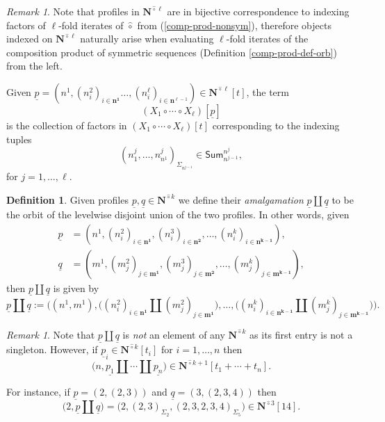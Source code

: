 \documentclass[11pt]{amsart}
\theoremstyle{definition}
\newtheorem{definition}[subsection]{Definition}
\theoremstyle{remark}
\newtheorem{remark}[subsection]{Remark}
\newcommand{\Ncirc}[1]{\mathbf{N}^{\hat{\circ}#1}}
\newcommand{\circhat}{\hat{\circ}}
\begin{document}
\begin{remark}
Note that profiles in $\Ncirc{\ell}$ are in bijective correspondence to indexing factors of $\ell$-fold iterates of $\circhat$ from (\ref{comp-prod-nonsym}), therefore objects indexed on $\Ncirc{\ell}$ naturally arise when evaluating $\ell$-fold iterates of the composition product of symmetric sequences (Definition \ref{comp-prod-def-orb}) from the left. 
\end{remark}

Given $\underline{p}=(n^1, (n^2_i)_{i\in\mathbf{n^1}}\dots, (n^{\ell}_i)_{i\in\mathbf{n}^{\ell-1}})\in\Ncirc{\ell}[t]$, the term \[(X_1\circ \cdots \circ X_{\ell})[\underline{p}]\] is the collection of factors in $(X_1\circ\cdots \circ X_{\ell})[t]$ corresponding to the indexing tuples \[(n^j_1,\dots,n^j_{n^1})_{\Sigma_{n^{j-1}}}\in\mathsf{Sum}_{n^{j-1}}^{n^j},\] for $j=1,\dots, \ell$.


\begin{definition} 
Given profiles $\underline{p},\underline{q}\in\Ncirc{k}$ we define their \textit{amalgamation} $\underline{p}\amalg \underline{q}$ to be the orbit of the levelwise disjoint union of the two profiles. In other words, given \begin{align*} 
\underline{p} & =(n^1,(n^2_{i})_{i\in \mathbf{n^1}}, (n^3_{i})_{i\in \mathbf{n^2}},\dots, (n^{k}_{i})_{i\in \mathbf{n^{k-1}}}), \\
\underline{q} & =(m^1,(m^2_{j})_{j\in \mathbf{m^1}}, (m^3_{j})_{j\in \mathbf{m^2}},\dots, (m^{k}_{j})_{j\in \mathbf{m^{k-1}}}),
\end{align*}
then $\underline{p}\amalg\underline{q}$ is given by\begin{equation*}
\underline{p}\amalg \underline{q}:=\Big((n^1,m^1),\big( (n^2_{i})_{i\in \mathbf{n^1}} \amalg (m^2_{j})_{j\in \mathbf{m^1}} \big) , \dots, \big( (n^{k}_{i})_{i\in \mathbf{n^{k-1}}} \amalg (m^{k}_{j})_{j\in \mathbf{m^{k-1}}}\big) \Big).\end{equation*}
\end{definition}

\begin{remark} Note that $\underline{p}\amalg \underline{q}$ is \textit{not} an element of any $\Ncirc{k}$ as its first entry is not a singleton. However, if $\underline{p}_i\in \Ncirc{k}[t_i]$ for $i=1,\dots,n$ then \[\big( n, \underline{p_1}\amalg\cdots \amalg \underline{p_n} \big)\in \Ncirc{k+1}[t_1+\cdots+t_n].\]

For instance, if $\underline{p}=(2,(2,3))$ and $\underline{q}=(3,(2,3,4))$ then \[\big(2,\underline{p}\amalg\underline{q}\big)=\big(2,(2,3)_{\Sigma_2},(2,3,2,3,4)_{\Sigma_5}\big)\in \Ncirc{3}[14].\] 
\end{remark}
\end{document}

